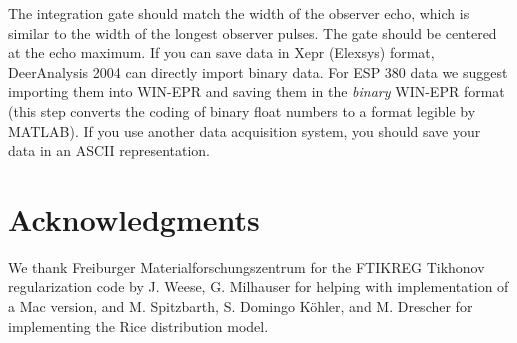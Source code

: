 \documentclass{article}
\begin{document}
The integration gate should match the width of the observer echo, which is similar to the width of the longest observer pulses. The gate should be centered at the echo maximum. If you can save data in Xepr (Elexsys) format, DeerAnalysis 2004 can directly import binary data. For ESP 380 data we suggest importing them into WIN-EPR and saving them in the {\em binary} WIN-EPR format (this step converts the coding of binary float numbers to a format legible by MATLAB). If you use another data acquisition system, you should save your data in an ASCII representation. 

\section*{Acknowledgments}
\label{acknowledge}
We thank Freiburger Materialforschungszentrum for the FTIKREG Tikhonov regularization code by J. Weese, G. Milhauser for helping with implementation of a Mac version, and M. Spitzbarth, S. Domingo K\"ohler, and M. Drescher for implementing the Rice distribution model.    
 

\end{document}
